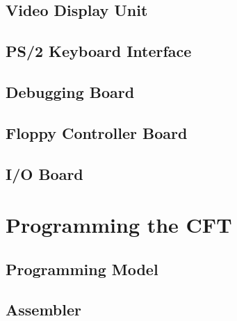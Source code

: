   \ifdefined\renderchapvdu
    \chapter{Video Display Unit}
    \glsresetall
    
  \fi

  \ifdefined\renderchapkbd
    \chapter{PS/2 Keyboard Interface}
    \glsresetall
    
  \fi

  \ifdefined\renderchapdeb
    \chapter{Debugging Board}
    \glsresetall
    
  \fi

  \ifdefined\renderchapfdc
    \chapter{Floppy Controller Board}
    \glsresetall
    
  \fi

  \ifdefined\renderchapiob
    \chapter{I/O Board}
    \glsresetall
    
  \fi
\fi


\ifdefined\renderpartprogramming

  \part{Programming the CFT}

  \chapter{Programming Model}
  \glsresetall

  \label{chap:programming-model}
    

  \chapter{Assembler}
  \glsresetall
  
\fi

